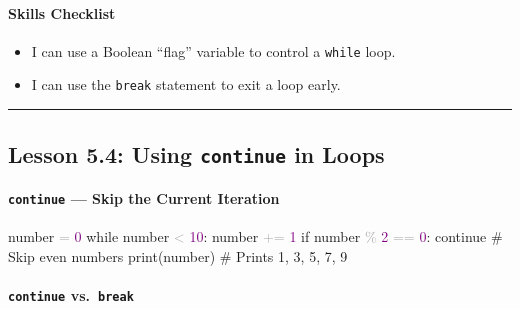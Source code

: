 \documentclass[
  justified,
  openright,
]{tufte-book}
\let\subsubsection\paragraph
\let\paragraph\paragraph
\newcommand{\BuiltInTok}[1]{#1}
\newcommand{\CommentTok}[1]{\textcolor{MidGray}{#1}}
\newcommand{\ControlFlowTok}[1]{\textcolor{BrandBlue}{#1}}
\newcommand{\DecValTok}[1]{\textcolor{Purple}{#1}}
\newcommand{\NormalTok}[1]{#1}
\newcommand{\OperatorTok}[1]{\textcolor{DarkGray}{#1}}
\newenvironment{Shaded}{%
  \begin{snugshade}
}{%
  \end{snugshade}
}
\let\subsubsection\paragraph
\let\paragraph\paragraph
\providecommand{\tightlist}{%
  \setlength{\itemsep}{0pt}\setlength{\parskip}{0pt}}
\begin{document}
\subsubsection{Skills Checklist}\label{skills-checklist-24}

\begin{itemize}
\tightlist
\item[$\square$]
  I can use a Boolean ``flag'' variable to control a \texttt{while}
  loop.
\item[$\square$]
  I can use the \texttt{break} statement to exit a loop early.
\end{itemize}

\begin{center}\rule{0.5\linewidth}{0.5pt}\end{center}

\subsection{\texorpdfstring{Lesson 5.4: Using \texttt{continue} in
Loops}{Lesson 5.4: Using continue in Loops}}\label{lesson-5.4-using-continue-in-loops}

\subsubsection{\texorpdfstring{\texttt{continue} --- Skip the Current
Iteration}{continue --- Skip the Current Iteration}}\label{continue-skip-the-current-iteration}

\begin{Shaded}
\begin{Highlighting}[]
\NormalTok{number }\OperatorTok{=} \DecValTok{0}
\ControlFlowTok{while}\NormalTok{ number }\OperatorTok{\textless{}} \DecValTok{10}\NormalTok{:}
\NormalTok{    number }\OperatorTok{+=} \DecValTok{1}
    \ControlFlowTok{if}\NormalTok{ number }\OperatorTok{\%} \DecValTok{2} \OperatorTok{==} \DecValTok{0}\NormalTok{:}
        \ControlFlowTok{continue}        \CommentTok{\# Skip even numbers}
    \BuiltInTok{print}\NormalTok{(number)       }\CommentTok{\# Prints 1, 3, 5, 7, 9}
\end{Highlighting}
\end{Shaded}

\subsubsection{\texorpdfstring{\texttt{continue}
vs.~\texttt{break}}{continue vs.~break}}\label{continue-vs.-break}
\end{document}
